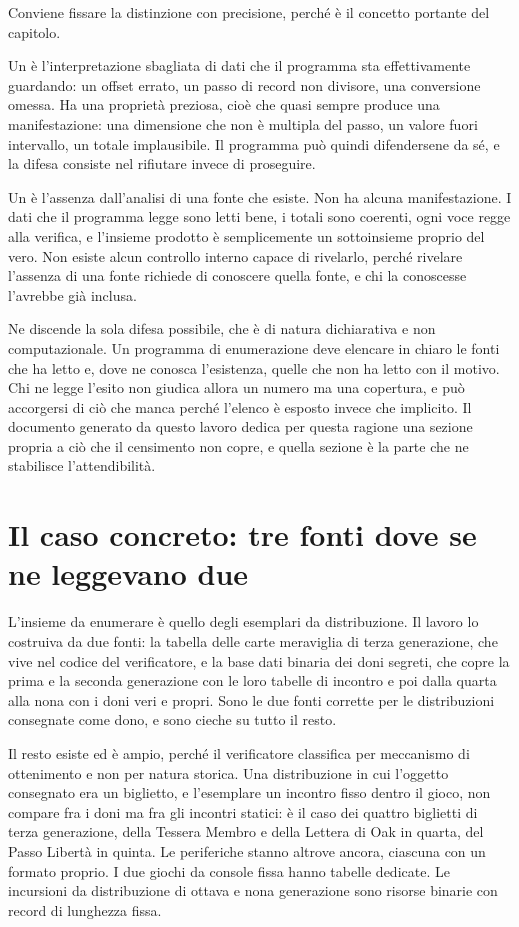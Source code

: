Conviene fissare la distinzione con precisione, perché è il concetto portante del capitolo.

Un  è l'interpretazione sbagliata di dati che il programma sta effettivamente guardando: un offset errato, un passo di record non divisore, una conversione omessa. Ha una proprietà preziosa, cioè che quasi sempre produce una manifestazione: una dimensione che non è multipla del passo, un valore fuori intervallo, un totale implausibile. Il programma può quindi difendersene da sé, e la difesa consiste nel rifiutare invece di proseguire.

Un  è l'assenza dall'analisi di una fonte che esiste. Non ha alcuna manifestazione. I dati che il programma legge sono letti bene, i totali sono coerenti, ogni voce regge alla verifica, e l'insieme prodotto è semplicemente un sottoinsieme proprio del vero. Non esiste alcun controllo interno capace di rivelarlo, perché rivelare l'assenza di una fonte richiede di conoscere quella fonte, e chi la conoscesse l'avrebbe già inclusa.

Ne discende la sola difesa possibile, che è di natura dichiarativa e non computazionale. Un programma di enumerazione deve elencare in chiaro le fonti che ha letto e, dove ne conosca l'esistenza, quelle che non ha letto con il motivo. Chi ne legge l'esito non giudica allora un numero ma una copertura, e può accorgersi di ciò che manca perché l'elenco è esposto invece che implicito. Il documento generato da questo lavoro dedica per questa ragione una sezione propria a ciò che il censimento non copre, e quella sezione è la parte che ne stabilisce l'attendibilità.

\section{Il caso concreto: tre fonti dove se ne leggevano due}

L'insieme da enumerare è quello degli esemplari da distribuzione. Il lavoro lo costruiva da due fonti: la tabella delle carte meraviglia di terza generazione, che vive nel codice del verificatore, e la base dati binaria dei doni segreti, che copre la prima e la seconda generazione con le loro tabelle di incontro e poi dalla quarta alla nona con i doni veri e propri. Sono le due fonti corrette per le distribuzioni consegnate come dono, e sono cieche su tutto il resto.

Il resto esiste ed è ampio, perché il verificatore classifica per meccanismo di ottenimento e non per natura storica. Una distribuzione in cui l'oggetto consegnato era un biglietto, e l'esemplare un incontro fisso dentro il gioco, non compare fra i doni ma fra gli incontri statici: è il caso dei quattro biglietti di terza generazione, della Tessera Membro e della Lettera di Oak in quarta, del Passo Libertà in quinta. Le periferiche stanno altrove ancora, ciascuna con un formato proprio. I due giochi da console fissa hanno tabelle dedicate. Le incursioni da distribuzione di ottava e nona generazione sono risorse binarie con record di lunghezza fissa.

